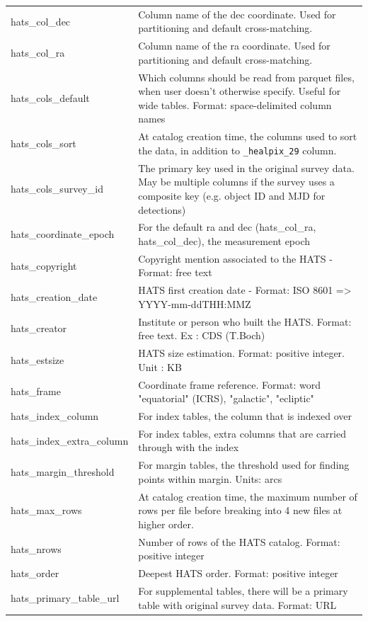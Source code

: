 \documentclass[11pt,a4paper]{ivoa}
\begin{document}
{\begin{longtable}[h!]{D{0.33\textwidth} D{0.67\textwidth}}
hats\_col\_dec &Column name of the dec coordinate. Used for partitioning and default cross-matching. \\
hats\_col\_ra &Column name of the ra coordinate. Used for partitioning and default cross-matching. \\
hats\_cols\_default &Which columns should be read from parquet files, when user doesn't otherwise specify. Useful for wide tables. Format: space-delimited column names \\
hats\_cols\_sort &At catalog creation time, the columns used to sort the data, in addition to \texttt{\_healpix\_29} column. \\
hats\_cols\_survey\_id &The primary key used in the original survey data. May be multiple columns if the survey uses a composite key (e.g. object ID and MJD for detections) \\
hats\_coordinate\_epoch &For the default ra and dec (hats\_col\_ra, hats\_col\_dec), the measurement epoch \\
hats\_copyright &Copyright mention associated to the HATS - Format: free text \\
hats\_creation\_date &HATS first creation date - Format: ISO 8601 => YYYY-mm-ddTHH:MMZ \\
hats\_creator &Institute or person who built the HATS. Format: free text. Ex : CDS (T.Boch) \\
hats\_estsize &HATS size estimation. Format: positive integer. Unit : KB \\
hats\_frame &Coordinate frame reference. Format: word "equatorial" (ICRS), "galactic", "ecliptic" \\
hats\_index\_column &For index tables, the column that is indexed over \\
hats\_index\_extra\_column &For index tables, extra columns that are carried through with the index \\
hats\_margin\_threshold &For margin tables, the threshold used for finding points within margin. Units: arcs \\
hats\_max\_rows &At catalog creation time, the maximum number of rows per file before breaking into 4 new files at higher order. \\
hats\_nrows &Number of rows of the HATS catalog. Format: positive integer \\
hats\_order &Deepest HATS order. Format: positive integer \\
hats\_primary\_table\_url &For supplemental tables, there will be a primary table with original survey data. Format: URL\\

\end{longtable}}
\end{document}
